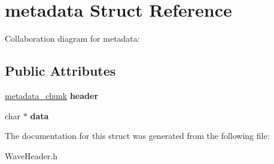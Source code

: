 \hypertarget{structmetadata}{}\section{metadata Struct Reference}
\label{structmetadata}


Collaboration diagram for metadata\+:
\subsection*{Public Attributes}
\begin{DoxyCompactItemize}
\item 
\mbox{\label{structmetadata_ad164d8ee72ad8fa5c8a67afdc8498d81}} 
\hyperlink{structmetadata__chunk}{metadata\+\_\+chunk} {\bfseries header}
\item 
\mbox{\label{structmetadata_ad0739602365064817f8f4fb04e4c6532}} 
char $\ast$ {\bfseries data}
\end{DoxyCompactItemize}


The documentation for this struct was generated from the following file\+:\begin{DoxyCompactItemize}
\item 
Wave\+Header.\+h\end{DoxyCompactItemize}
